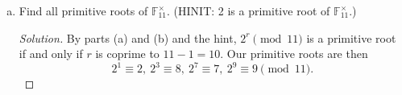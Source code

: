 \documentclass[11pt,letterpaper]{report}
\newcommand{\field}{\mathbb{F}}
\newenvironment{solution}
{\begin{proof}[Solution]}
{\end{proof}}
\begin{document}
\begin{enumerate}[(a)]
	\item Find all primitive roots of $\field_{11}^\times$. (HINIT: 2 is a primitive root of $\field_{11}^\times$.)
	\begin{solution}
		By parts (a) and (b) and the hint, $2^r \pmod{11}$ is a primitive root if and only if $r$ is coprime to $11-1 = 10$. Our primitive roots are then
		\[
		2^1 \equiv 2,\ 2^3\equiv 8,\ 2^7\equiv 7,\ 2^9\equiv 9\pmod{11}.
		\]
	\end{solution}
\end{enumerate}
\end{document}
